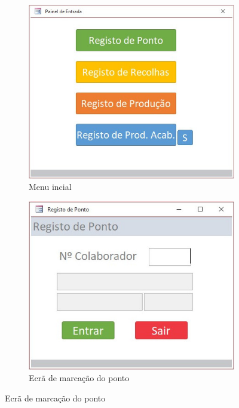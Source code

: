 \begin{figure}[h!]
	\centering
	
	\begin{subfigure}[c]{0.3\linewidth}
		\includegraphics[width=\linewidth]{figuras/AppAccess/0-MenuInicial.jpg}
		\caption{Menu incial}
	\end{subfigure}
	\begin{subfigure}[c]{0.3\linewidth}
		\includegraphics[width=\linewidth]{figuras/AppAccess/1-Ponto.jpg}
		\caption{Ecrã de marcação do ponto}
	\end{subfigure}

\end{figure}
